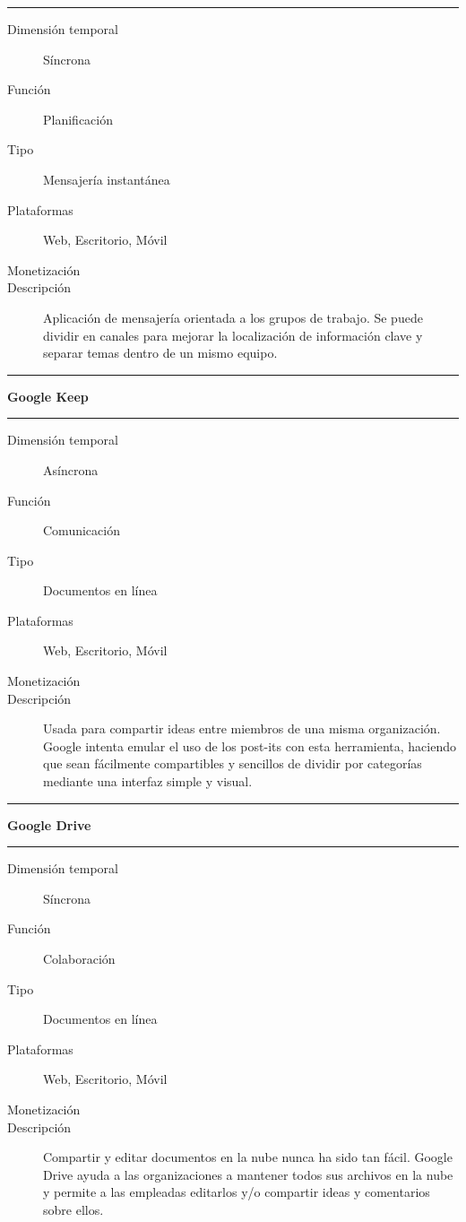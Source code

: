 \noindent\rule{\textwidth}{0.5pt}


\begin{description}
    \item[Dimensión temporal] Síncrona 
    \item[Función] Planificación
    \item[Tipo] Mensajería instantánea 
    \item[Plataformas] Web, Escritorio, Móvil 
    \item[Monetización]
    \item[Descripción]
    Aplicación de mensajería orientada a los grupos de trabajo. Se puede dividir en canales para mejorar la localización de información clave y separar temas dentro de un mismo equipo.
\end{description}

\noindent\rule{\textwidth}{0.5pt}

{ \large \textbf{Google Keep} }

\noindent\rule{\textwidth}{0.5pt}

\begin{description}
    \item[Dimensión temporal] Asíncrona 
    \item[Función] Comunicación
    \item[Tipo] Documentos en línea
    \item[Plataformas] Web, Escritorio, Móvil 
    \item[Monetización]
    \item[Descripción]
    Usada para compartir ideas entre miembros de una misma organización. Google intenta emular el uso de los post-its con esta herramienta, haciendo que sean fácilmente compartibles y sencillos de dividir por categorías mediante una interfaz simple y visual.
\end{description}

\noindent\rule{\textwidth}{0.5pt}

{ \large \textbf{Google Drive} }

\noindent\rule{\textwidth}{0.5pt}

\begin{description}
    \item[Dimensión temporal] Síncrona
    \item[Función] Colaboración
    \item[Tipo] Documentos en línea
    \item[Plataformas] Web, Escritorio, Móvil 
    \item[Monetización]
    \item[Descripción]
    Compartir y editar documentos en la nube nunca ha sido tan fácil. Google Drive ayuda a las organizaciones a mantener todos sus archivos en la nube y permite a las empleadas editarlos y/o compartir ideas y comentarios sobre ellos.
\end{description}


